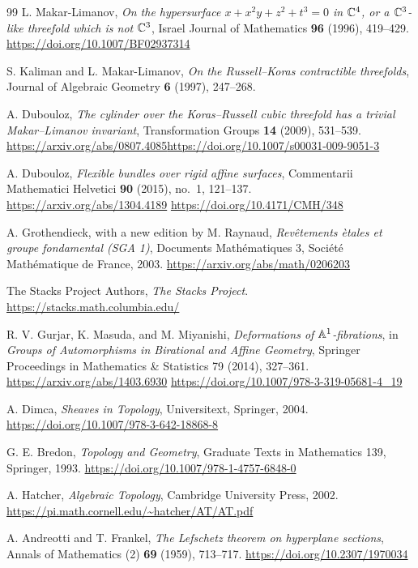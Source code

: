\begin{thebibliography}{99}
L. Makar-Limanov,
\emph{On the hypersurface $x+x^2y+z^2+t^3=0$ in $\mathbb C^4$, or a $\mathbb C^3$-like threefold which is not $\mathbb C^3$},
Israel Journal of Mathematics \textbf{96} (1996), 419--429.
\url{https://doi.org/10.1007/BF02937314}

S. Kaliman and L. Makar-Limanov,
\emph{On the Russell--Koras contractible threefolds},
Journal of Algebraic Geometry \textbf{6} (1997), 247--268.

A. Dubouloz,
\emph{The cylinder over the Koras--Russell cubic threefold has a trivial Makar--Limanov invariant},
Transformation Groups \textbf{14} (2009), 531--539.
\url{https://arxiv.org/abs/0807.4085}\quad\url{https://doi.org/10.1007/s00031-009-9051-3}


A. Dubouloz,
\emph{Flexible bundles over rigid affine surfaces},
Commentarii Mathematici Helvetici \textbf{90} (2015), no.~1, 121--137.
\url{https://arxiv.org/abs/1304.4189}\quad
\url{https://doi.org/10.4171/CMH/348}

A. Grothendieck, with a new edition by M. Raynaud,
\emph{Rev\^etements \`etales et groupe fondamental (SGA 1)},
Documents Math\'ematiques 3, Soci\'et\'e Math\'ematique de France, 2003.
\url{https://arxiv.org/abs/math/0206203}

The Stacks Project Authors,
\emph{The Stacks Project}.
\url{https://stacks.math.columbia.edu/}

R. V. Gurjar, K. Masuda, and M. Miyanishi,
\emph{Deformations of $\mathbb A^1$-fibrations},
in \emph{Groups of Automorphisms in Birational and Affine Geometry}, Springer Proceedings in Mathematics \& Statistics 79 (2014), 327--361.
\url{https://arxiv.org/abs/1403.6930}\quad
\url{https://doi.org/10.1007/978-3-319-05681-4_19}

A. Dimca,
\emph{Sheaves in Topology},
Universitext, Springer, 2004.
\url{https://doi.org/10.1007/978-3-642-18868-8}

G. E. Bredon,
\emph{Topology and Geometry},
Graduate Texts in Mathematics 139, Springer, 1993.
\url{https://doi.org/10.1007/978-1-4757-6848-0}

A. Hatcher,
\emph{Algebraic Topology},
Cambridge University Press, 2002.
\url{https://pi.math.cornell.edu/~hatcher/AT/AT.pdf}

A. Andreotti and T. Frankel,
\emph{The Lefschetz theorem on hyperplane sections},
Annals of Mathematics (2) \textbf{69} (1959), 713--717.
\url{https://doi.org/10.2307/1970034}


\end{thebibliography}
